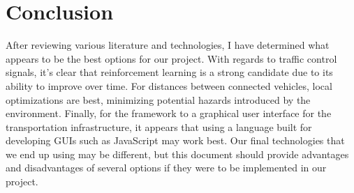 \documentclass[10pt,letterpaper,draftclsnofoot,onecolumn]{IEEEtran}
\begin{document}
\section{Conclusion}
After reviewing various literature and technologies, I have determined what appears to be the best options for our project. With regards to traffic control signals, it’s clear that reinforcement learning is a strong candidate due to its ability to improve over time. For distances between connected vehicles, local optimizations are best, minimizing potential hazards introduced by the environment. Finally, for the framework to a graphical user interface for the transportation infrastructure, it appears that using a language built for developing GUIs such as JavaScript may work best. Our final technologies that we end up using may be different, but this document should provide advantages and disadvantages of several options if they were to be implemented in our project.


\end{document}
